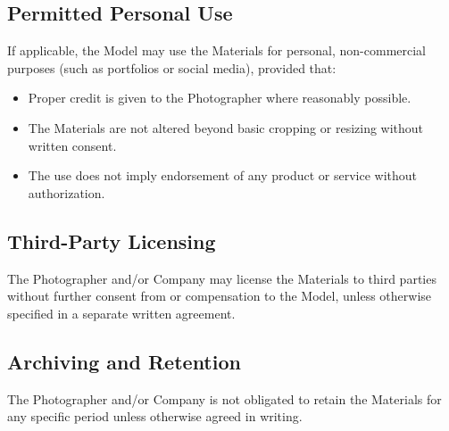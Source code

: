 \subsection{Permitted Personal Use}
If applicable, the Model may use the Materials for personal, non-commercial purposes (such as portfolios or social media), provided that:

\begin{itemize}
  \item Proper credit is given to the Photographer where reasonably possible.
  \item The Materials are not altered beyond basic cropping or resizing without written consent.
  \item The use does not imply endorsement of any product or service without authorization.
\end{itemize}

\subsection{Third-Party Licensing}
The Photographer and/or Company may license the Materials to third parties without further consent from or compensation to the Model, unless otherwise specified in a separate written agreement.

\subsection{Archiving and Retention}
The Photographer and/or Company is not obligated to retain the Materials for any specific period unless otherwise agreed in writing.

